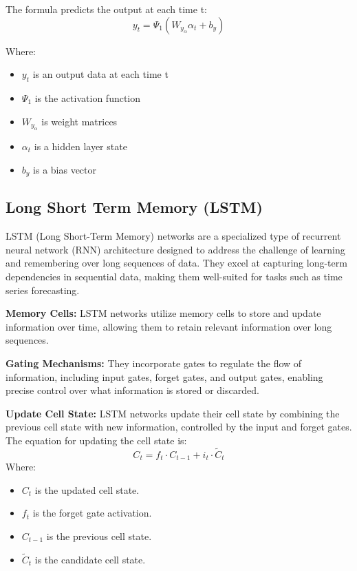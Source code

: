 \documentclass{ieeeojies}
\begin{document}
The formula predicts the output at each time t:\\
\[ y_t = \Psi_1(W_y_\alpha\alpha_t + b_y) \]

Where:\\
    \begin{itemize}
        \item $y_t$ is an output data at each time t
        \item $\Psi_1$ is the activation function
        \item $W_y_\alpha$ is weight matrices
        \item $\alpha_t$ is a hidden layer state
        \item $b_y$ is a bias vector
    \end{itemize}


\subsection{Long Short Term Memory (LSTM)}
LSTM (Long Short-Term Memory) networks are a specialized type of recurrent neural network (RNN) architecture designed to address the challenge of learning and remembering over long sequences of data. They excel at capturing long-term dependencies in sequential data, making them well-suited for tasks such as time series forecasting.

\textbf{Memory Cells:} LSTM networks utilize memory cells to store and update information over time, allowing them to retain relevant information over long sequences.
  
\textbf{Gating Mechanisms:} They incorporate gates to regulate the flow of information, including input gates, forget gates, and output gates, enabling precise control over what information is stored or discarded.

\textbf{Update Cell State:} LSTM networks update their cell state by combining the previous cell state with new information, controlled by the input and forget gates. The equation for updating the cell state is:
\begin{equation*}
  C_t = f_t \cdot C_{t-1} + i_t \cdot \tilde{C}_t
\end{equation*}
Where:
        \begin{itemize}
            \item \( C_t \) is the updated cell state.
            \item \( f_t \) is the forget gate activation.
            \item \( C_{t-1} \) is the previous cell state.
            \item \( \tilde{C}_t \) is the candidate cell state.
        \end{itemize}
\end{document}
